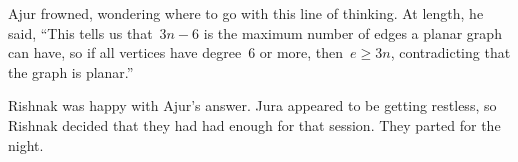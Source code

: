 Ajur frowned, wondering where to go with this line of thinking. At length, he said, ``This tells us that~$3n-6$ is the maximum number of edges a planar graph can have, so if all vertices have degree~6 or more, then~$e\ge3n$, contradicting that the graph is planar.''

Rishnak was happy with Ajur's answer.
Jura appeared to be getting restless, so Rishnak decided that they had had enough for that session.
They parted for the night.
